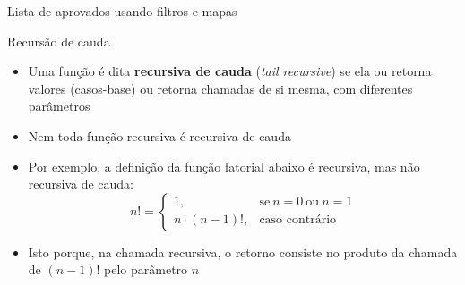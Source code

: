 \begin{frame}[fragile]{Lista de aprovados usando filtros e mapas}
\end{frame}

\begin{frame}[fragile]{Recursão de cauda}

    \begin{itemize}
        \item Uma função é dita \textbf{recursiva de cauda} (\textit{tail recursive}) se ela ou 
            retorna valores (casos-base) ou retorna chamadas de si mesma, com diferentes parâmetros

        \item Nem toda função recursiva é recursiva de cauda

        \item Por exemplo, a definição da função fatorial abaixo é recursiva, mas não recursiva
            de cauda:
        \[
            n! = \left\lbrace \begin{array}{ll} 1,& \mbox{se}\ n = 0\ \mbox{ou}\ n = 1 \\
                n\cdot (n - 1)!,& \mbox{caso contrário} \end{array}\right.
        \]

        \item Isto porque, na chamada recursiva, o retorno consiste no produto da chamada 
            de $(n - 1)!$ pelo parâmetro $n$ 

    \end{itemize}

\end{frame}

